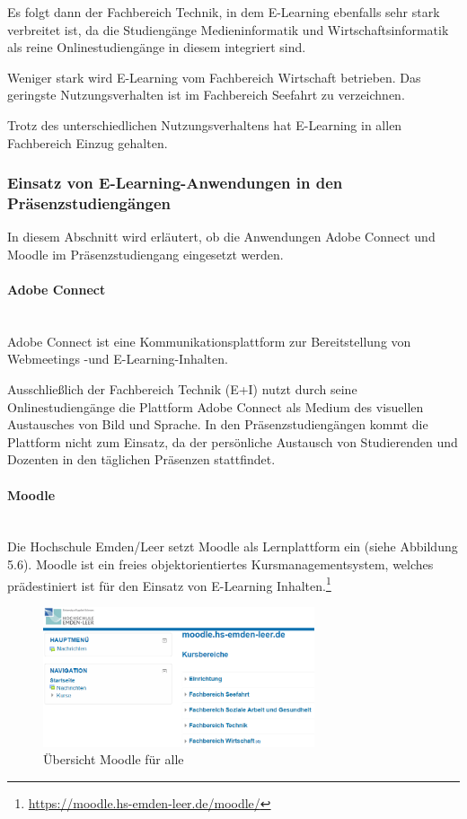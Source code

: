 Es folgt dann der Fachbereich Technik, in dem E-Learning ebenfalls sehr stark verbreitet ist, da die Studiengänge Medieninformatik und Wirtschaftsinformatik als reine Onlinestudiengänge in diesem integriert sind.

Weniger stark wird E-Learning vom Fachbereich Wirtschaft betrieben. Das geringste Nutzungsverhalten ist im Fachbereich Seefahrt zu verzeichnen.

Trotz des unterschiedlichen Nutzungsverhaltens hat E-Learning in allen Fachbereich Einzug gehalten.

\subsubsection[Einsatz von E-Learning-Anwendungen]{Einsatz von E-Learning-Anwendungen in den Präsenzstudiengängen}
In diesem Abschnitt wird erläutert, ob die Anwendungen Adobe Connect und Moodle im Präsenzstudiengang eingesetzt werden.

\paragraph{Adobe Connect}\mbox{} \\

Adobe Connect ist eine Kommunikationsplattform zur Bereitstellung von Webmeetings -und E-Learning-Inhalten.

Ausschließlich der Fachbereich Technik (E+I) nutzt durch seine Onlinestudiengänge die Plattform Adobe Connect als Medium des visuellen Austausches von Bild und Sprache. In den Präsenzstudiengängen kommt die Plattform nicht zum Einsatz, da der persönliche Austausch von Studierenden und Dozenten in den täglichen Präsenzen stattfindet.

\paragraph{Moodle}\mbox{} \\

Die Hochschule Emden/Leer setzt Moodle als Lernplattform ein (siehe Abbildung 5.6). Moodle ist ein freies objektorientiertes Kursmanagementsystem, welches prädestiniert ist für den Einsatz von E-Learning Inhalten.\footnote{\url{https://moodle.hs-emden-leer.de/moodle/}}

\begin{figure}[h!]
	\centering
	\includegraphics[width=8cm]{kapitel/gruppe2/bilder/moodle}
	\caption{Übersicht Moodle für alle}
	\label{fig_moodle}
\end{figure}

